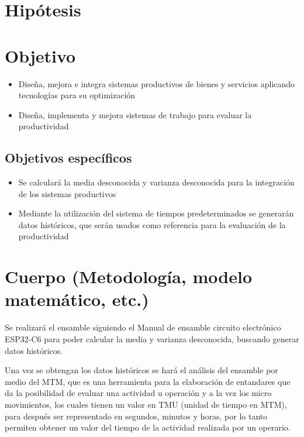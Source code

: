     \section{Hipótesis}
    
    
    
    \section{Objetivo}
    \begin{itemize}
        \item Diseña, mejora e integra sistemas productivos de bienes y servicios aplicando tecnologías para su optimización
        \item Diseña, implementa y mejora sistemas de trabajo para evaluar la productividad
    \end{itemize}
    
    \subsection{Objetivos específicos }
    
    \begin{itemize}
    
    \item Se calculará la media desconocida y varianza desconocida para la integración de los sistemas productivos
    \item Mediante la utilización del sistema de tiempos predeterminados se generarán datos históricos, que serán usados como referencia para la evaluación de la productividad
    
    \end{itemize}
    \section{Cuerpo (Metodología, modelo matemático, etc.)}
    
     Se realizará el ensamble siguiendo el Manual de ensamble circuito electrónico ESP32-C6 para poder calcular la media y varianza desconocida, buscando generar datos históricos. 
    
     Una vez se obtengan los datos históricos se hará el análisis del ensamble por medio del MTM, que es una herramienta para la elaboración de entandares que da la posibilidad de evaluar una actividad u operación y a la vez los micro movimientos, los cuales tienen un valor en TMU (unidad de tiempo en MTM), para después ser representado en segundos, minutos y horas, por lo tanto permiten obtener un valor del tiempo de la actividad realizada por un operario.\cite{navarro2006estandarizacion}
    

